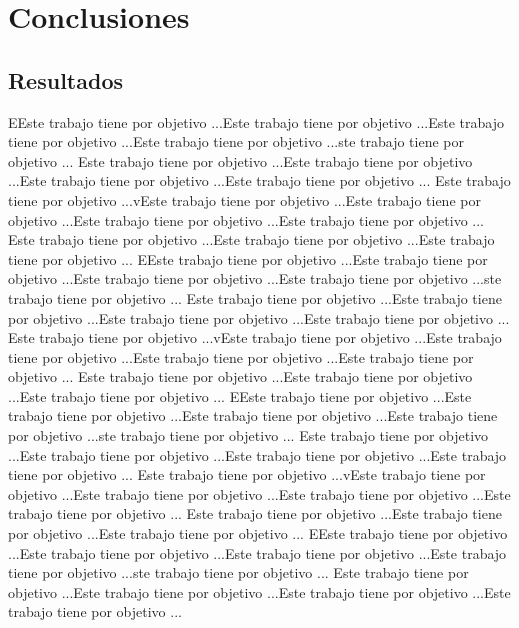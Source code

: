 \chapter{Conclusiones}
\section{Resultados} 
EEste trabajo tiene por objetivo ...Este trabajo tiene por objetivo ...Este trabajo tiene por objetivo ...Este trabajo tiene por objetivo ...ste trabajo tiene por objetivo ...
Este trabajo tiene por objetivo ...Este trabajo tiene por objetivo ...Este trabajo tiene por objetivo ...Este trabajo tiene por objetivo ...\cite{steiner_peaks_1987}
Este trabajo tiene por objetivo ...vEste trabajo tiene por objetivo ...Este trabajo tiene por objetivo ...Este trabajo tiene por objetivo ...Este trabajo tiene por objetivo ...
Este trabajo tiene por objetivo ...Este trabajo tiene por objetivo ...Este trabajo tiene por objetivo ...
EEste trabajo tiene por objetivo ...Este trabajo tiene por objetivo ...Este trabajo tiene por objetivo ...Este trabajo tiene por objetivo ...ste trabajo tiene por objetivo ...
Este trabajo tiene por objetivo ...Este trabajo tiene por objetivo ...Este trabajo tiene por objetivo ...Este trabajo tiene por objetivo ...
Este trabajo tiene por objetivo ...vEste trabajo tiene por objetivo ...Este trabajo tiene por objetivo ...Este trabajo tiene por objetivo ...Este trabajo tiene por objetivo ...
Este trabajo tiene por objetivo ...Este trabajo tiene por objetivo ...Este trabajo tiene por objetivo ...
EEste trabajo tiene por objetivo ...Este trabajo tiene por objetivo ...Este trabajo tiene por objetivo ...Este trabajo tiene por objetivo ...ste trabajo tiene por objetivo ...
Este trabajo tiene por objetivo ...Este trabajo tiene por objetivo ...Este trabajo tiene por objetivo ...Este trabajo tiene por objetivo ...
Este trabajo tiene por objetivo ...vEste trabajo tiene por objetivo ...Este trabajo tiene por objetivo ...Este trabajo tiene por objetivo ...Este trabajo tiene por objetivo ...
Este trabajo tiene por objetivo ...Este trabajo tiene por objetivo ...Este trabajo tiene por objetivo ...
EEste trabajo tiene por objetivo ...Este trabajo tiene por objetivo ...Este trabajo tiene por objetivo ...Este trabajo tiene por objetivo ...ste trabajo tiene por objetivo ...
Este trabajo tiene por objetivo ...Este trabajo tiene por objetivo ...Este trabajo tiene por objetivo ...Este trabajo tiene por objetivo ...
